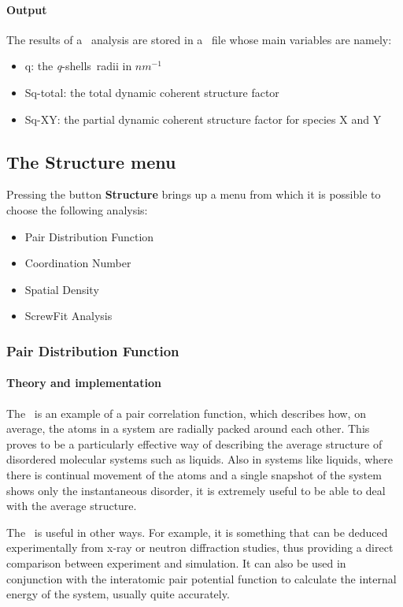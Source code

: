 \documentclass[a4paper,11pt]{report}
\newcommand{\invnm}{$nm^{-1}$}
\newcommand{\qshells}{\textit{q}-shells}
\begin{document}
\paragraph{Output\\}
The results of a \SSCSF\ analysis are stored in a \NetCDF\ file whose main variables are namely:
\begin{itemize}
\item{q: the \qshells\ radii in \invnm }
\item{Sq-total: the total dynamic coherent structure factor}
\item{Sq-XY: the partial dynamic coherent structure factor for species X and Y}
\end{itemize}

\subsection{The Structure menu}
\label{structure_menu}
Pressing the button \textbf{Structure} brings up a menu from which it is possible to choose the following analysis:
\begin{itemize}
\item Pair Distribution Function
\item Coordination Number
\item Spatial Density
\item ScrewFit Analysis
\end{itemize}

\subsubsection{Pair Distribution Function}
\label{pdf}
\paragraph{Theory and implementation\\}
\label{pdf_theory}
The \PDF\ is an example of a pair correlation function, which describes how, on average, 
the atoms in a system are radially packed around each other. This proves to be a particularly effective way of describing 
the average structure of disordered molecular systems such as liquids. Also in systems like liquids, where there is 
continual movement of the atoms and a single snapshot of the system shows only the instantaneous disorder, it is extremely 
useful to be able to deal with the average structure.

The \PDF\ is useful in other ways. For example, it is something that can be deduced experimentally from x-ray or neutron 
diffraction studies, thus providing a direct comparison between experiment and simulation. It can also be used in 
conjunction with the interatomic pair potential function to calculate the internal energy of the system, usually quite 
accurately.
\end{document}
